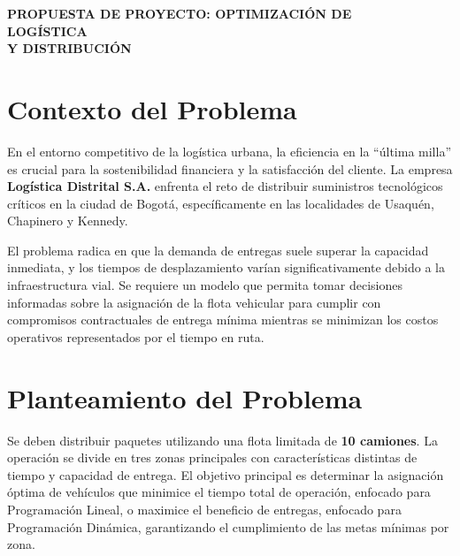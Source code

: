 \documentclass[12pt]{article}
\begin{document}
	
	\begin{center}
		\vspace*{0.8cm}
		{\Huge\bfseries\color{darkblue} PROPUESTA DE PROYECTO: OPTIMIZACIÓN DE}\\[0.05cm]
		{\Huge\bfseries\color{darkblue} LOGÍSTICA}\\[0.05cm]
		{\Huge\bfseries\color{darkblue} Y DISTRIBUCIÓN}
	\end{center}
	
	\vspace{0.8cm}
	
	\section{Contexto del Problema}
	En el entorno competitivo de la logística urbana, la eficiencia en la “última milla” es crucial para la sostenibilidad financiera y la satisfacción del cliente. La empresa \textbf{Logística Distrital S.A.} enfrenta el reto de distribuir suministros tecnológicos críticos en la ciudad de Bogotá, específicamente en las localidades de Usaquén, Chapinero y Kennedy.
	
	El problema radica en que la demanda de entregas suele superar la capacidad inmediata, y los tiempos de desplazamiento varían significativamente debido a la infraestructura vial. Se requiere un modelo que permita tomar decisiones informadas sobre la asignación de la flota vehicular para cumplir con compromisos contractuales de entrega mínima mientras se minimizan los costos operativos representados por el tiempo en ruta.
	
	\section{Planteamiento del Problema}
	Se deben distribuir paquetes utilizando una flota limitada de \textbf{10 camiones}. La operación se divide en tres zonas principales con características distintas de tiempo y capacidad de entrega. El objetivo principal es determinar la asignación óptima de vehículos que minimice el tiempo total de operación, enfocado para Programación Lineal, o maximice el beneficio de entregas, enfocado para Programación Dinámica, garantizando el cumplimiento de las metas mínimas por zona.
	
\end{document}
